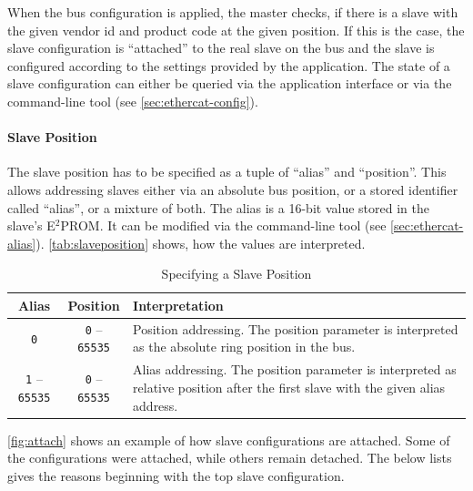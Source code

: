 \documentclass[a4paper,12pt,BCOR=6mm,bibtotoc,idxtotoc]{scrbook}
\begin{document}
When the bus configuration is applied, the master checks, if there is a slave
with the given vendor id and product code at the given position. If this is
the case, the slave configuration is ``attached'' to the real slave on the bus
and the slave is configured according to the settings provided by the
application. The state of a slave configuration can either be queried via the
application interface or via the command-line tool (see
\autoref{sec:ethercat-config}).

\paragraph{Slave Position} The slave position has to be specified as a tuple
of ``alias'' and ``position''. This allows addressing slaves either via an
absolute bus position, or a stored identifier called ``alias'', or a mixture
of both. The alias is a 16-bit value stored in the slave's E$^2$PROM. It can
be modified via the command-line tool (see \autoref{sec:ethercat-alias}).
\autoref{tab:slaveposition} shows, how the values are interpreted.

\begin{table}[htbp]
  \centering
  \caption{Specifying a Slave Position}
  \label{tab:slaveposition}
  \vspace{2mm}
  \begin{tabular}{c|c|p{70mm}}
    Alias & Position & Interpretation\\
    \hline

    \lstinline+0+ & \lstinline+0+ -- \lstinline+65535+ &

    Position addressing. The position parameter is interpreted as the absolute
    ring position in the bus.\\ \hline

    \lstinline+1+ -- \lstinline+65535+ & \lstinline+0+ -- \lstinline+65535+ &

    Alias addressing. The position parameter is interpreted as relative
    position after the first slave with the given alias address. \\ \hline

  \end{tabular}
\end{table}

\autoref{fig:attach} shows an example of how slave configurations are
attached. Some of the configurations were attached, while others remain
detached. The below lists gives the reasons beginning with the top slave
configuration.
\end{document}
